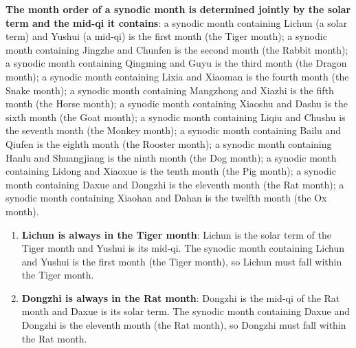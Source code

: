 \begin{definition}\label{def:jieqi_zhongqi_dingyue}
\textbf{The month order of a synodic month is determined jointly by the solar term and the mid-qi it contains}: a synodic month containing Lichun (a solar term) and Yushui (a mid-qi) is the first month (the Tiger month); a synodic month containing Jingzhe and Chunfen is the second month (the Rabbit month); a synodic month containing Qingming and Guyu is the third month (the Dragon month); a synodic month containing Lixia and Xiaoman is the fourth month (the Snake month); a synodic month containing Mangzhong and Xiazhi is the fifth month (the Horse month); a synodic month containing Xiaoshu and Dashu is the sixth month (the Goat month); a synodic month containing Liqiu and Chushu is the seventh month (the Monkey month); a synodic month containing Bailu and Qiufen is the eighth month (the Rooster month); a synodic month containing Hanlu and Shuangjiang is the ninth month (the Dog month); a synodic month containing Lidong and Xiaoxue is the tenth month (the Pig month); a synodic month containing Daxue and Dongzhi is the eleventh month (the Rat month); a synodic month containing Xiaohan and Dahan is the twelfth month (the Ox month).
\end{definition}

\begin{theorem}\label{thm:lichun_yinyue_dongzhi_haiyue}
\begin{enumerate}[label=(\roman*)]
    \item \textbf{Lichun is always in the Tiger month}: Lichun is the solar term of the Tiger month and Yushui is its mid-qi. The synodic month containing Lichun and Yushui is the first month (the Tiger month), so Lichun must fall within the Tiger month.
    \item \textbf{Dongzhi is always in the Rat month}: Dongzhi is the mid-qi of the Rat month and Daxue is its solar term. The synodic month containing Daxue and Dongzhi is the eleventh month (the Rat month), so Dongzhi must fall within the Rat month.
\end{enumerate}
\end{theorem}

